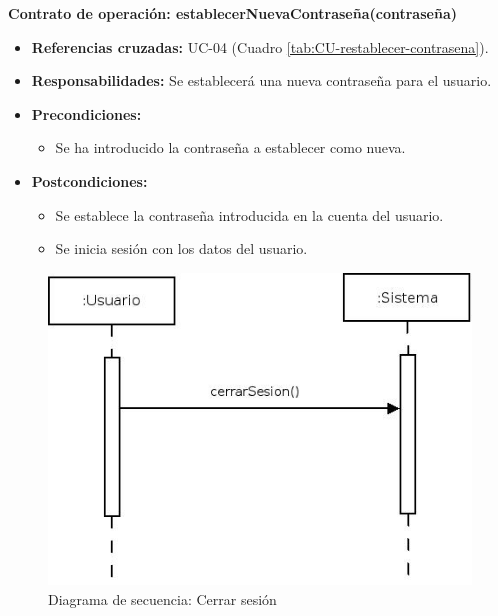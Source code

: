 \textbf{Contrato de operación: establecerNuevaContraseña(contraseña)}
\begin{itemize}
\item \textbf{Referencias cruzadas:} UC-04 (Cuadro \ref{tab:CU-restablecer-contrasena}).
\item \textbf{Responsabilidades:} Se establecerá una nueva contraseña para el usuario.
\item \textbf{Precondiciones:} 
 \begin{itemize}
\item Se ha introducido la contraseña a establecer como nueva.
\end {itemize}
\item \textbf{Postcondiciones:} 
 \begin{itemize}
\item Se establece la contraseña introducida en la cuenta del usuario.
\item Se inicia sesión con los datos del usuario. 
\end {itemize}
\end {itemize}


\vspace{10mm}

\begin{figure}[H]
\centering
  \includegraphics[scale=.55]{img/secuencias/gestion-usuarios-cerrar-sesion.jpeg}
  \caption{Diagrama de secuencia: Cerrar sesión}
  \label{fig:secuencia-gestion-usuarios-cerrar-sesion}
\end{figure}

